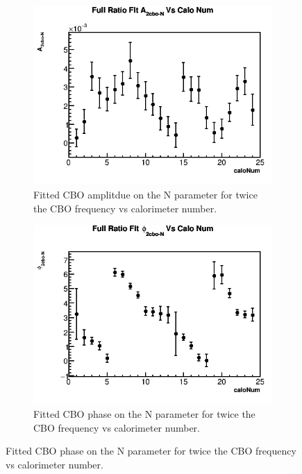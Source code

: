 	\begin{figure}[h]
	\centering
	    \begin{subfigure}[t]{0.4\textwidth}
		    \centering
			\includegraphics[width=\textwidth]{RatioCBOFit_A_2cbo-N_Vs_Calo_Canv}
		    \caption{Fitted CBO amplitdue on the N parameter for twice the CBO frequency vs calorimeter number.}
	    \end{subfigure}
	    \hspace{4mm}
	    \begin{subfigure}[t]{0.4\textwidth}
		    \centering
			\includegraphics[width=\textwidth]{RatioCBOFit_phi_2cbo-N_Vs_Calo_Canv}
		    \caption{Fitted CBO phase on the N parameter for twice the CBO frequency vs calorimeter number.}

\end{subfigure}
\end{figure}
